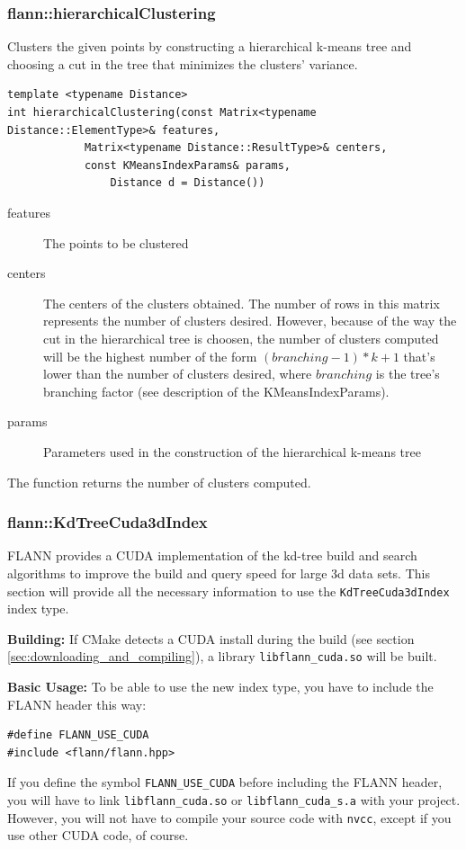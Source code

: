 \documentclass[letter,10pt]{article}
\begin{document}
\subsubsection{flann::hierarchicalClustering}
\label{flann::hierarchicalClustering}
Clusters the given points by constructing a hierarchical k-means tree and choosing a cut in the tree that minimizes the clusters' variance.

\begin{Verbatim}[fontsize=\footnotesize,frame=single]
template <typename Distance>
int hierarchicalClustering(const Matrix<typename Distance::ElementType>& features, 
			Matrix<typename Distance::ResultType>& centers,
			const KMeansIndexParams& params, 
		        Distance d = Distance())
\end{Verbatim}
\begin{description}
\item[features]{The points to be clustered}
\item[centers]{The centers of the clusters obtained. The number of rows in this matrix represents the number of clusters desired.
However, because of the way the cut in the hierarchical tree is choosen, the number of clusters computed will be
 the highest number of the form $(branching-1)*k+1$ that's lower than the number of clusters desired, where $branching$ is the tree's 
branching factor (see description of the KMeansIndexParams).  }
\item[params]{Parameters used in the construction of the hierarchical k-means tree}
\end{description}
The function returns the number of clusters computed.

\subsubsection{flann::KdTreeCuda3dIndex}
\label{sec:flann::cuda}
FLANN provides a CUDA implementation of the kd-tree build and search algorithms to improve the build and query speed for large 3d data sets. This section will provide all the necessary information to use the \texttt{KdTreeCuda3dIndex} index type.

\textbf{Building:}
If CMake detects a CUDA install during the build (see section \ref{sec:downloading_and_compiling}), a library \texttt{libflann\_cuda.so} will be built. 

\textbf{Basic Usage:}
To be able to use the new index type, you have to include the FLANN header this way:
\begin{Verbatim}[fontsize=\footnotesize,frame=single]
#define FLANN_USE_CUDA
#include <flann/flann.hpp>
\end{Verbatim}
If you define the symbol \texttt{FLANN\_USE\_CUDA} before including the FLANN header, you will have to link \texttt{libflann\_cuda.so} or \texttt{libflann\_cuda\_s.a} with your project. 
However, you will not have to compile your source code with \texttt{nvcc}, except if you use other CUDA code, of course.
\end{document}
